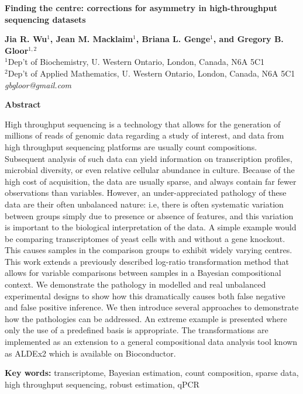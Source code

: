 \documentclass[10pt]{article}
\begin{document}
\begin{center}
\textbf{\large Finding the centre: corrections for asymmetry in high-throughput sequencing datasets}

\vskip 0.25cm

\textbf{Jia R. Wu}$^{1}$\textbf{, Jean M. Macklaim}$^{1}$\textbf{, Briana L. Genge}$^{1}$\textbf{, and
Gregory B. Gloor}$^{1,2}$ \\
{\small $^{1}$Dep't of Biochemistry, U. Western Ontario, London, Canada, N6A 5C1\\
$^{2}$Dep't of Applied Mathematics, U. Western Ontario, London, Canada, N6A 5C1 \\
\textit{gbgloor@gmail.com} \\
}
\end{center}

\vskip 0.5cm {\centerline{\bf Abstract}}

High throughput sequencing is a technology that allows for the generation of millions of reads of genomic data regarding a study of interest, and data from high throughput sequencing platforms are usually count compositions. Subsequent analysis of such data can yield information on transcription profiles, microbial diversity, or even relative cellular abundance in culture. Because of the high cost of acquisition, the data are usually sparse, and always contain far fewer observations than variables. However, an under-appreciated pathology of these data are their often unbalanced nature: i.e, there is often systematic variation between groups simply due to presence or absence of features, and this variation is important to the biological interpretation of the data. A simple example would be comparing transcriptomes of yeast cells with and without a gene knockout. This causes samples in the comparison groups to exhibit widely varying centres. This work extends a previously described log-ratio transformation method that allows for variable comparisons between samples in a Bayesian compositional context. We demonstrate the pathology in  modelled and real unbalanced experimental designs to show how this dramatically causes both false negative and false positive inference. We then introduce several approaches to demonstrate how the pathologies can be addressed. An extreme example is presented where only the use of a predefined basis is appropriate. The transformations are implemented as an extension to a general compositional data analysis tool known as ALDEx2 which is available on Bioconductor. 

{\bf Key words: } transcriptome, Bayesian estimation, count composition, sparse data, high throughput sequencing, robust estimation, qPCR
\end{document}
